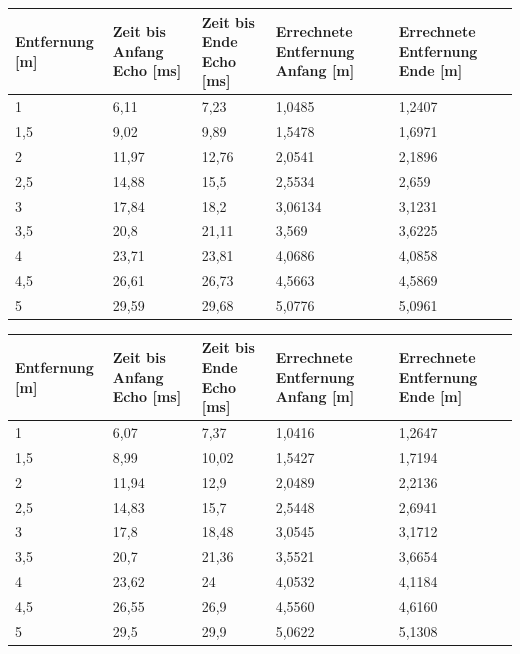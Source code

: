 \begin{minipage}{1\textwidth}
\begin{tabularx}{\textwidth}{|p{}|p{}|p{}|p{}|X|}
\hline
Entfernung [m]& Zeit bis Anfang Echo [ms] & Zeit bis Ende Echo [ms] & Errechnete Entfernung Anfang [m] & Errechnete Entfernung Ende [m]\\
\hline
1 & 6,11 & 7,23 & 1,0485 & 1,2407\\
\hline
1,5 & 9,02 & 9,89 & 1,5478 & 1,6971\\
\hline
2 & 11,97 & 12,76 & 2,0541 & 2,1896\\
\hline
2,5 & 14,88 & 15,5 & 2,5534 & 2,659\\
\hline
3 & 17,84 & 18,2 & 3,06134 & 3,1231\\
\hline
3,5 & 20,8 & 21,11 & 3,569 & 3,6225\\
\hline
4 & 23,71 & 23,81 & 4,0686 & 4,0858\\
\hline
4,5 & 26,61 & 26,73 & 4,5663 & 4,5869\\
\hline
5 & 29,59 & 29,68 & 5,0776 & 5,0961\\
\hline
\end{tabularx}
\label{tab:Entfernungsmessung5V}
\begin{tabularx}{\textwidth}{|p{}|p{}|p{}|p{}|X|}
\hline
Entfernung [m]& Zeit bis Anfang Echo [ms] & Zeit bis Ende Echo [ms] & Errechnete Entfernung Anfang [m] & Errechnete Entfernung Ende [m]\\
\hline
1 & 6,07 & 7,37 & 1,0416 & 1,2647\\
\hline
1,5 & 8,99 & 10,02 & 1,5427 & 1,7194\\
\hline
2 & 11,94 & 12,9 & 2,0489 & 2,2136\\
\hline
2,5 & 14,83 & 15,7 & 2,5448 & 2,6941\\
\hline
3 & 17,8 & 18,48 & 3,0545 & 3,1712\\
\hline
3,5 & 20,7 & 21,36 & 3,5521 & 3,6654\\
\hline
4 & 23,62 & 24 & 4,0532 & 4,1184\\
\hline
4,5 & 26,55 & 26,9 & 4,5560 & 4,6160\\
\hline
5 & 29,5 & 29,9 & 5,0622 & 5,1308\\
\hline
\end{tabularx}
\label{tab:Entfernungsmessung10V}
\end{minipage}\\